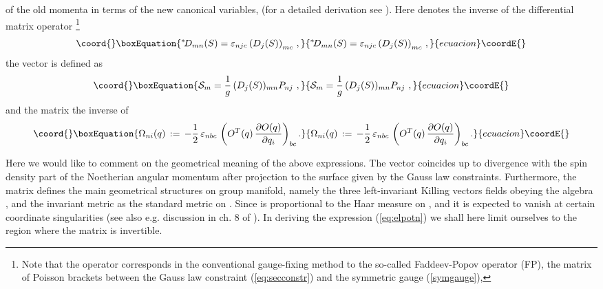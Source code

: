 \documentclass[a4paper,12pt]{article}
\begin{document}
of the old momenta \coordHE{} in terms of the new canonical variables,
(for a detailed derivation see \cite{KP}).
Here \coordHE{} denotes the inverse of
the differential matrix operator
\footnote{Note that the operator \coordHE{}
 corresponds in the conventional gauge-fixing
method to the so-called Faddeev-Popov operator (FP),
the matrix of Poisson brackets between the Gauss law constraint
(\ref{eq:secconstr}) and  the symmetric gauge (\ref{symgauge}),
 \coordHE{} }
\begin{equation}\coord{}\boxEquation{
\label{DeltaQ}
{}^\ast\! D_{mn}(S)  =  \varepsilon_{njc}\left(D_j(S)\right)_{mc}\,,
}{
{}^\ast\! D_{mn}(S)  =  \varepsilon_{njc}\left(D_j(S)\right)_{mc}\,,
}{ecuacion}\coordE{}\end{equation}
the vector \coordHE{} is defined as
\begin{equation}\coord{}\boxEquation{
{\cal S}_m   = \frac{1}{g} \, (D_j(S))_{mn}P_{nj}~,
}{
{\cal S}_m   = \frac{1}{g} \, (D_j(S))_{mn}P_{nj}~,
}{ecuacion}\coordE{}\end{equation}
and the matrix \coordHE{} the inverse of
\begin{equation}\coord{}\boxEquation{
\label{Omega}
\Omega_{ni}(q) \, : =
\,-\frac{1}{2}\, \varepsilon_{nbc}\,
\left( O^T(q)\, \frac{\partial O(q)}{\partial q_i}\right)_{bc}.
}{
\Omega_{ni}(q) \, : =
\,-\frac{1}{2}\, \varepsilon_{nbc}\,
\left( O^T(q)\, \frac{\partial O(q)}{\partial q_i}\right)_{bc}.
}{ecuacion}\coordE{}\end{equation}

Here we would like to comment on the geometrical meaning of the above expressions.
The vector \coordHE{} coincides up to divergence with the spin density part
of the Noetherian angular momentum after projection to the surface given by
the Gauss law constraints.
Furthermore, the matrix \coordHE{} defines the main geometrical
structures on \coordHE{} group manifold, namely the three
left-invariant Killing vectors fields
\coordHE{} obeying the
\coordHE{} algebra \coordHE{},
and the invariant  metric \coordHE{}
as the standard metric on \coordHE{}.
Since \myHighlight{$\det\Omega$}\coordHE{} is proportional to the Haar measure
on \coordHE{}  \coordHE{},
and it is expected to vanish at certain coordinate singularities
(see also e.g. discussion in  ch. 8 of \cite{Creutz}).
In deriving the expression (\ref{eq:elpotn}) we shall here limit ourselves to
the region where the matrix \myHighlight{$\Omega$}\coordHE{} is invertible.
\end{document}
